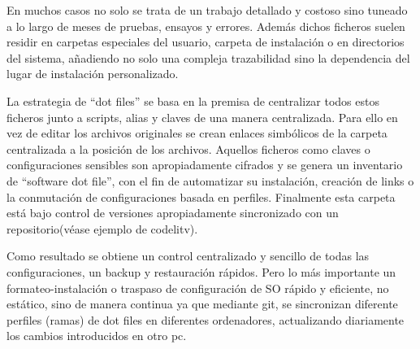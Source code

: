 En muchos casos no solo se trata de un trabajo detallado y costoso sino tuneado a lo largo de meses de pruebas, ensayos y errores. Además dichos ficheros suelen residir en carpetas especiales del usuario, carpeta de instalación o en directorios del sistema, añadiendo no solo una compleja trazabilidad sino la dependencia del lugar de instalación personalizado.

La estrategia de “dot files” se basa en la premisa de centralizar todos estos ficheros junto a scripts, alias y claves de una manera centralizada. Para ello en vez de editar los archivos originales se crean enlaces simbólicos de la carpeta centralizada a la posición de los archivos. Aquellos ficheros como claves o configuraciones sensibles son apropiadamente cifrados y se genera un inventario de “software dot file”, con el fin de automatizar su instalación, creación de links o la conmutación de configuraciones basada en perfiles. Finalmente esta carpeta está bajo control de versiones apropiadamente sincronizado con un repositorio(véase ejemplo de codelitv\cite{c_dot_repository}).

Como resultado se obtiene un control centralizado y sencillo de todas las configuraciones, un backup y restauración rápidos. Pero lo más importante un formateo-instalación o traspaso de configuración de SO rápido y eficiente, no estático, sino de manera continua ya que mediante git, se sincronizan diferente perfiles (ramas) de dot files en diferentes ordenadores, actualizando diariamente los cambios introducidos en otro pc.
